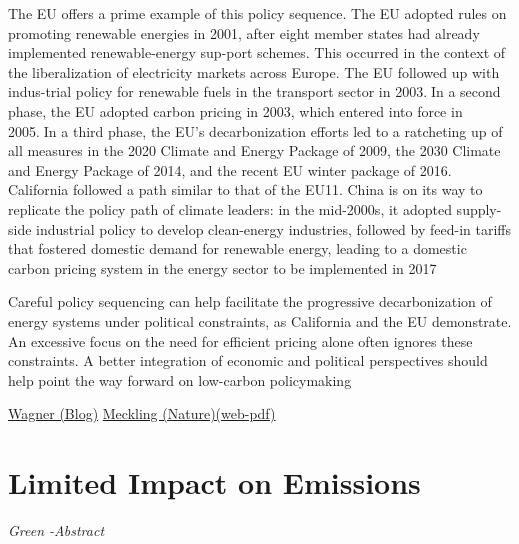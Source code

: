 \documentclass[
]{book}
\begin{document}
The EU offers a prime example of this policy sequence. The EU adopted rules on promoting renewable energies in 2001, after eight member states had already implemented renewable-energy sup-port schemes. This occurred in the context of the liberalization of electricity markets across Europe. The EU followed up with indus-trial policy for renewable fuels in the transport sector in 2003.In a second phase, the EU adopted carbon pricing in 2003, which entered into force in 2005.In a third phase, the EU's decarbonization efforts led to a ratcheting up of all measures in the 2020 Climate and Energy Package of 2009, the 2030 Climate and Energy Package of 2014, and the recent EU winter package of 2016. California followed a path similar to that of the EU11. China is on its way to replicate the policy path of climate leaders: in the mid-2000s, it adopted supply-side industrial policy to develop clean-energy industries, followed by feed-in tariffs that fostered domestic demand for renewable energy, leading to a domestic carbon pricing system in the energy sector to be implemented in 2017

Careful policy sequencing can help facilitate the progressive decarbonization of energy systems under political constraints, as California and the EU demonstrate. An excessive focus on the need for efficient pricing alone often ignores these constraints. A better integration of economic and political perspectives should help point the way forward on low-carbon policymaking

\href{https://gwagner.com/policy-sequencing}{Wagner (Blog)}
\href{http://rdcu.be/yqPt}{Meckling (Nature)(web-pdf)}

\hypertarget{limited-impact-on-emissions}{%
\section{Limited Impact on Emissions}\label{limited-impact-on-emissions}}

\emph{Green -Abstract}
\end{document}
